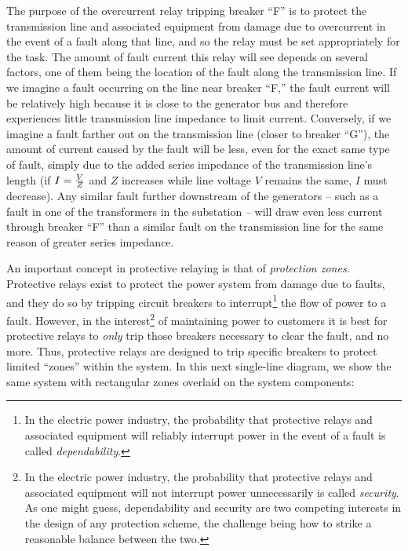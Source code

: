 The purpose of the overcurrent relay tripping breaker ``F'' is to protect the transmission line and associated equipment from damage due to overcurrent in the event of a fault along that line, and so the relay must be set appropriately for the task.  The amount of fault current this relay will see depends on several factors, one of them being the location of the fault along the transmission line.  If we imagine a fault occurring on the line near breaker ``F,'' the fault current will be relatively high because it is close to the generator bus and therefore experiences little transmission line impedance to limit current.  Conversely, if we imagine a fault farther out on the transmission line (closer to breaker ``G''), the amount of current caused by the fault will be less, even for the exact same type of fault, simply due to the added series impedance of the transmission line's length (if $I = {V \over Z}$ and $Z$ increases while line voltage $V$ remains the same, $I$ must decrease).  Any similar fault further downstream of the generators -- such as a fault in one of the transformers in the substation -- will draw even less current through breaker ``F'' than a similar fault on the transmission line for the same reason of greater series impedance.

\filbreak

An important concept in protective relaying is that of \textit{protection zones}.  Protective relays exist to protect the power system from damage due to faults, and they do so by tripping circuit breakers to interrupt\footnote{In the electric power industry, the probability that protective relays and associated equipment will reliably interrupt power in the event of a fault is called \textit{dependability}.} the flow of power to a fault.  However, in the interest\footnote{In the electric power industry, the probability that protective relays and associated equipment will not interrupt power unnecessarily is called \textit{security}.  As one might guess, dependability and security are two competing interests in the design of any protection scheme, the challenge being how to strike a reasonable balance between the two.} of maintaining power to customers it is best for protective relays to \textit{only} trip those breakers necessary to clear the fault, and no more.  Thus, protective relays are designed to trip specific breakers to protect limited ``zones'' within the system.  In this next single-line diagram, we show the same system with rectangular zones overlaid on the system components:    


